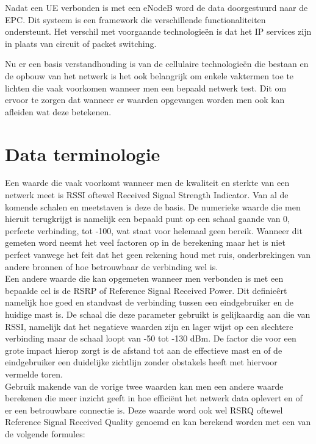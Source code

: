 Nadat een UE verbonden is met een eNodeB word de data doorgestuurd naar de EPC. Dit systeem is een framework die verschillende functionaliteiten ondersteunt. Het verschil met voorgaande technologieën is dat het IP services zijn in plaats van circuit of packet switching. \autocite{Awati2024}

\pagebreak

Nu er een basis verstandhouding is van de cellulaire technologieën die bestaan en de opbouw van het netwerk is het ook belangrijk om enkele vaktermen toe te lichten die vaak voorkomen wanneer men een bepaald netwerk test. Dit om ervoor te zorgen dat wanneer er waarden opgevangen worden men ook kan afleiden wat deze betekenen.

\section{Data terminologie}

Een waarde die vaak voorkomt wanneer men de kwaliteit en sterkte van een netwerk meet is RSSI oftewel Received Signal Strength Indicator. Van al de komende schalen en meetstaven is deze de basis. De numerieke waarde die men hieruit terugkrijgt is namelijk een bepaald punt op een schaal gaande van 0, perfecte verbinding, tot -100, wat staat voor helemaal geen bereik. Wanneer dit gemeten word neemt het veel factoren op in de berekening maar het is niet perfect vanwege het feit dat het geen rekening houd met ruis, onderbrekingen van andere bronnen of hoe betrouwbaar de verbinding wel is.  \autocite{Ramirez2023} \\

Een andere waarde die kan opgemeten wanneer men verbonden is met een bepaalde cel is de RSRP of Reference Signal Received Power. Dit definieêrt namelijk hoe goed en standvast de verbinding tussen een eindgebruiker en de huidige mast is. De schaal die deze parameter gebruikt is gelijkaardig aan die van RSSI, namelijk dat het negatieve waarden zijn en lager wijst op een slechtere verbinding maar de schaal loopt van -50 tot -130 dBm. De factor die voor een grote impact hierop zorgt is de afstand tot aan de effectieve mast en of de eindgebruiker een duidelijke zichtlijn zonder obstakels heeft met hiervoor vermelde toren. \autocite{Ramirez2023} \\

Gebruik makende van de vorige twee waarden kan men een andere waarde berekenen die meer inzicht geeft in hoe efficiënt het netwerk data oplevert en of er een betrouwbare connectie is. \autocite{Apostu2024} Deze waarde word ook wel RSRQ oftewel Reference Signal Received Quality genoemd en kan berekend worden met een van de volgende formules:

